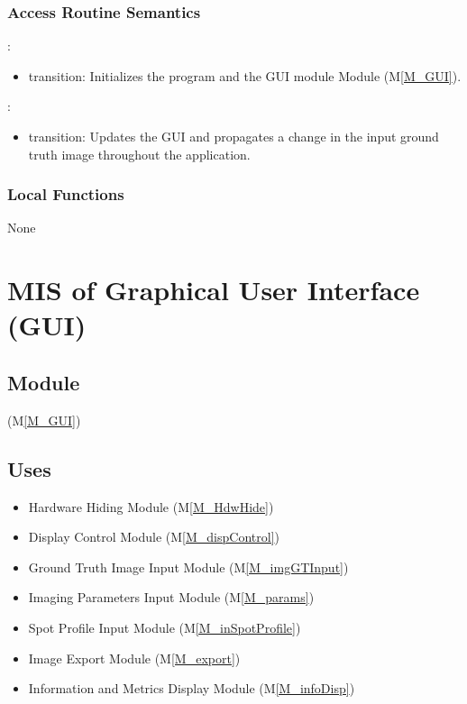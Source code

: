 \documentclass[12pt, titlepage]{article}
\newcommand{\mref}[1]{M\ref{#1}}
\newcommand{\mrefp}[1]{(\mref{#1})}
\newcommand{\mreff}[1]{Module \mrefp{#1}}
\begin{document}
\subsubsection{Access Routine Semantics}

\noindent {}:
\begin{itemize}
\item transition: Initializes the program and the GUI module \mreff{M_GUI}.
\end{itemize}

\noindent {}:
\begin{itemize}
\item transition: Updates the GUI and propagates a change in the input ground truth
image throughout the application.
\end{itemize}

\subsubsection{Local Functions}
None
\newpage



\section{MIS of Graphical User Interface (GUI)} \label{MS_GUI}

\subsection{Module}
 \mrefp{M_GUI}

\subsection{Uses}
\begin{itemize}
  \item Hardware Hiding \mreff{M_HdwHide}
  \item Display Control \mreff{M_dispControl}
  \item Ground Truth Image Input \mreff{M_imgGTInput}
  \item Imaging Parameters Input \mreff{M_params}
  \item Spot Profile Input \mreff{M_inSpotProfile}
  \item Image Export \mreff{M_export}
  \item Information and Metrics Display \mreff{M_infoDisp}
\end{itemize}
\end{document}
